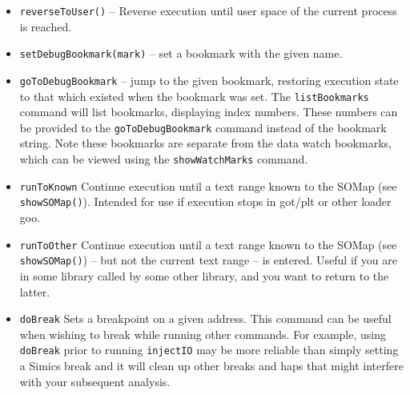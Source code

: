 \documentclass[titlepage]{article}
\begin{document}
\begin{itemize}
\item {\tt reverseToUser()} – Reverse execution until user space of the current process is reached.

\item {\tt setDebugBookmark(mark)} – set a bookmark with the given name.

\item {\tt goToDebugBookmark} – jump to the given bookmark, restoring execution state to that which existed when the bookmark was set.  The
{\tt listBookmarks} command will list bookmarks, displaying  index numbers.  These numbers can be provided to the {\tt goToDebugBookmark} command instead
of the bookmark string.  Note these bookmarks are separate from the data watch bookmarks, which can be viewed using the {\tt showWatchMarks} command.

\item {\tt runToKnown} Continue execution until a text range known to the SOMap (see {\tt showSOMap()}).  Intended for use if execution stops in got/plt 
or other loader goo.

\item {\tt runToOther} Continue execution until a text range known to the SOMap (see {\tt showSOMap()}) -- but not the current text range -- is entered.
Useful if you are in some library called by some other library, and you want to return to the latter.

\item {\tt doBreak} Sets a breakpoint on a given address.  This command can be useful when wishing to break while running other commands.  For example,
using {\tt doBreak} prior to running {\tt injectIO} may be more reliable than simply setting a Simics break and it will clean up other breaks and haps that 
might interfere with your subsequent analysis.

\end{itemize}
\end{document}
